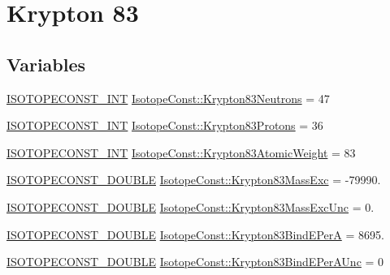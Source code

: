 \hypertarget{group___isotope_const-_krypton-_kr83}{}\section{Krypton 83}
\label{group___isotope_const-_krypton-_kr83}
\subsection*{Variables}
\begin{DoxyCompactItemize}
\item 
\mbox{\hyperlink{group___isotope_const-_macros_ga5f18360b3e99483a35c32d789e62621c}{I\+S\+O\+T\+O\+P\+E\+C\+O\+N\+S\+T\+\_\+\+I\+NT}} \mbox{\hyperlink{group___isotope_const-_krypton-_kr83_gaa97e32cec33a17558e64f668ce43aafb}{Isotope\+Const\+::\+Krypton83\+Neutrons}} = 47
\item 
\mbox{\hyperlink{group___isotope_const-_macros_ga5f18360b3e99483a35c32d789e62621c}{I\+S\+O\+T\+O\+P\+E\+C\+O\+N\+S\+T\+\_\+\+I\+NT}} \mbox{\hyperlink{group___isotope_const-_krypton-_kr83_ga562f786a690062da46759763ae6a76b6}{Isotope\+Const\+::\+Krypton83\+Protons}} = 36
\item 
\mbox{\hyperlink{group___isotope_const-_macros_ga5f18360b3e99483a35c32d789e62621c}{I\+S\+O\+T\+O\+P\+E\+C\+O\+N\+S\+T\+\_\+\+I\+NT}} \mbox{\hyperlink{group___isotope_const-_krypton-_kr83_ga7d49a4d4abb43834ce54a1f9b3fbd6d6}{Isotope\+Const\+::\+Krypton83\+Atomic\+Weight}} = 83
\item 
\mbox{\hyperlink{group___isotope_const-_macros_ga8f45a7272ce02c0b4c65c44636ed719a}{I\+S\+O\+T\+O\+P\+E\+C\+O\+N\+S\+T\+\_\+\+D\+O\+U\+B\+LE}} \mbox{\hyperlink{group___isotope_const-_krypton-_kr83_gadecc1351f9e0deb140149fa07912f4de}{Isotope\+Const\+::\+Krypton83\+Mass\+Exc}} = -\/79990.
\item 
\mbox{\hyperlink{group___isotope_const-_macros_ga8f45a7272ce02c0b4c65c44636ed719a}{I\+S\+O\+T\+O\+P\+E\+C\+O\+N\+S\+T\+\_\+\+D\+O\+U\+B\+LE}} \mbox{\hyperlink{group___isotope_const-_krypton-_kr83_ga3bacacfa5679f28ad0a2ba7652bfaedf}{Isotope\+Const\+::\+Krypton83\+Mass\+Exc\+Unc}} = 0.
\item 
\mbox{\hyperlink{group___isotope_const-_macros_ga8f45a7272ce02c0b4c65c44636ed719a}{I\+S\+O\+T\+O\+P\+E\+C\+O\+N\+S\+T\+\_\+\+D\+O\+U\+B\+LE}} \mbox{\hyperlink{group___isotope_const-_krypton-_kr83_gaff29141ebb835fd5657b2b8989338c55}{Isotope\+Const\+::\+Krypton83\+Bind\+E\+PerA}} = 8695.
\item 
\mbox{\hyperlink{group___isotope_const-_macros_ga8f45a7272ce02c0b4c65c44636ed719a}{I\+S\+O\+T\+O\+P\+E\+C\+O\+N\+S\+T\+\_\+\+D\+O\+U\+B\+LE}} \mbox{\hyperlink{group___isotope_const-_krypton-_kr83_gafe940dbf08eec8fe0a0c9cfd4f0bd167}{Isotope\+Const\+::\+Krypton83\+Bind\+E\+Per\+A\+Unc}} = 0

\end{DoxyCompactItemize}
